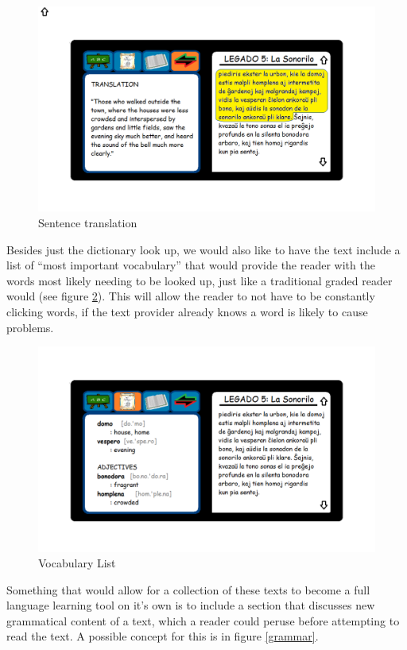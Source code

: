 \documentclass[11pt]{article}
\begin{document}
\begin{figure}[h]
  \caption{Sentence translation}
  \label{sentences}
  \includegraphics[scale=.5]{translate_tab.png}
\end{figure}

Besides just the dictionary look up, we would also like to have the text include a list of ``most important vocabulary'' that would provide the reader with the words most likely needing to be looked up, just like a traditional graded reader would (see figure \ref{vocab}). This will allow the reader to not have to be constantly clicking words, if the text provider already knows a word is likely to cause problems.

\begin{figure}[h]
  \caption{Vocabulary List}
  \label{vocab}
  \includegraphics[scale=.5]{vocabulary_list.png}
\end{figure}

Something that would allow for a collection of these texts to become a full language learning tool on it's own is to include a section that discusses new grammatical content of a text, which a reader could peruse before attempting to read the text.  A possible concept for this is in figure \ref{grammar}.
\end{document}
